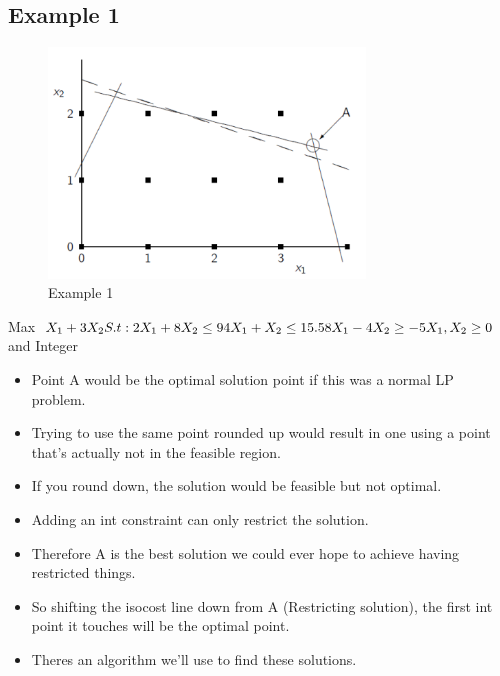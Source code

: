 \documentclass[12pt, a4paper]{article}
\begin{document}
\subsection*{Example 1}
\begin{figure}[ht]
    \centering
    \includegraphics*[width=0.75\textwidth]{example1}
    \caption{Example 1}
    \label{fig: Example 1}
\end{figure}
\pagebreak

Max $
    X_1 +3X_2\\
    S.t:\\
    2X_1+8X_2 \leq 9\\
    4X_1+X_2 \leq 15.5\\
    8X_1-4X_2 \geq -5\\
    X_1, X_2 \geq 0
$ and Integer\\
\begin{itemize}
    \item Point A would be the optimal solution point if this was a normal LP problem.
    \item Trying to use the same point rounded up would result in one using a point that's actually not in the feasible region.
    \item If you round down, the solution would be feasible but not optimal.
    \item Adding an int constraint can only restrict the solution.
    \item Therefore A is the best solution we could ever hope to achieve having restricted things.
    \item So shifting the isocost line down from A (Restricting solution), the first int point it touches will be the optimal point.
    \item Theres an algorithm we'll use to find these solutions.
\end{itemize}
\end{document}
